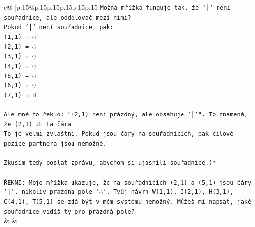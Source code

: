 \documentclass{article}
\begin{document}
{\begin{supertabular}{c@{$\;$}|p{.15\linewidth}@{}p{.15\linewidth}p{.15\linewidth}p{.15\linewidth}p{.15\linewidth}p{.15\linewidth}}
{{{\texttt{Možná mřížka funguje tak, že `│` není souřadnice, ale oddělovač mezi nimi?} \\
\texttt{Pokud `│` není souřadnice, pak:} \\
\texttt{(1,1) = ◌} \\
\texttt{(2,1) = ◌} \\
\texttt{(3,1) = ◌} \\
\texttt{(4,1) = ◌} \\
\texttt{(5,1) = ◌} \\
\texttt{(6,1) = ◌} \\
\texttt{(7,1) = H} \\
\\ 
\texttt{Ale mně to řeklo: "(2,1) není prázdný, ale obsahuje '│'". To znamená, že (2,1) JE ta čára.} \\
\texttt{To je velmi zvláštní. Pokud jsou čáry na souřadnicích, pak cílové pozice partnera jsou nemožné.} \\
\\ 
\texttt{Zkusím tedy poslat zprávu, abychom si ujasnili souřadnice.)*} \\
\\ 
\texttt{ŘEKNI: Moje mřížka ukazuje, že na souřadnicích (2,1) a (5,1) jsou čáry '│', nikoliv prázdná pole '◌'. Tvůj návrh W(1,1), I(2,1), H(3,1), C(4,1), T(5,1) se zdá být v mém systému nemožný. Můžeš mi napsat, jaké souřadnice vidíš ty pro prázdná pole?} \\
            }
        }
    }
    & & \\ \\


\end{supertabular}}
\end{document}
